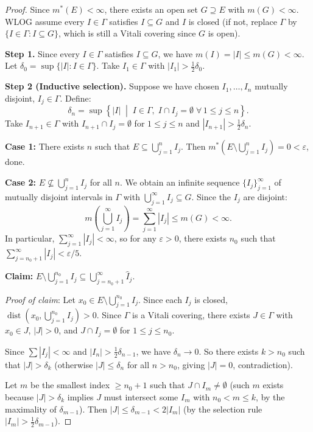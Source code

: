 \documentclass[11pt]{report}
\begin{document}
\begin{proof}
Since $m^*(E) < \infty$, there exists an open set $G \supseteq E$ with $m(G) < \infty$. WLOG assume every $I \in \Gamma$ satisfies $I \subseteq G$ and $I$ is closed (if not, replace $\Gamma$ by $\{I \in \Gamma : I \subseteq G\}$, which is still a Vitali covering since $G$ is open).

\textbf{Step 1.} Since every $I \in \Gamma$ satisfies $I \subseteq G$, we have $m(I) = |I| \leq m(G) < \infty$. Let $\delta_0 = \sup\{|I| : I \in \Gamma\}$. Take $I_1 \in \Gamma$ with $|I_1| > \frac{1}{2}\delta_0$.

\textbf{Step 2 (Inductive selection).} Suppose we have chosen $I_1, \ldots, I_n$ mutually disjoint, $I_j \in \Gamma$. Define:
\[
\delta_n = \sup\left\{|I| \;\middle|\; I \in \Gamma,\; I \cap I_j = \emptyset \;\forall\, 1 \leq j \leq n\right\}.
\]
Take $I_{n+1} \in \Gamma$ with $I_{n+1} \cap I_j = \emptyset$ for $1 \leq j \leq n$ and $|I_{n+1}| > \frac{1}{2}\delta_n$.

\textbf{Case 1:} There exists $n$ such that $E \subseteq \bigcup_{j=1}^{n} I_j$. Then $m^*(E \setminus \bigcup_{j=1}^{n} I_j) = 0 < \varepsilon$, done.

\textbf{Case 2:} $E \not\subseteq \bigcup_{j=1}^{n} I_j$ for all $n$. We obtain an infinite sequence $\{I_j\}_{j=1}^{\infty}$ of mutually disjoint intervals in $\Gamma$ with $\bigcup_{j=1}^{\infty} I_j \subseteq G$. Since the $I_j$ are disjoint:
\[
m\!\left(\bigcup_{j=1}^{\infty} I_j\right) = \sum_{j=1}^{\infty} |I_j| \leq m(G) < \infty.
\]
In particular, $\sum_{j=1}^{\infty} |I_j| < \infty$, so for any $\varepsilon > 0$, there exists $n_0$ such that $\sum_{j=n_0+1}^{\infty} |I_j| < \varepsilon/5$.

\textbf{Claim:} $E \setminus \bigcup_{j=1}^{n_0} I_j \subseteq \bigcup_{j=n_0+1}^{\infty} \hat{I}_j$.

\textit{Proof of claim}: Let $x_0 \in E \setminus \bigcup_{j=1}^{n_0} I_j$. Since each $I_j$ is closed, $\operatorname{dist}(x_0, \bigcup_{j=1}^{n_0} I_j) > 0$. Since $\Gamma$ is a Vitali covering, there exists $J \in \Gamma$ with $x_0 \in J$, $|J| > 0$, and $J \cap I_j = \emptyset$ for $1 \leq j \leq n_0$.

Since $\sum |I_j| < \infty$ and $|I_n| > \frac{1}{2}\delta_{n-1}$, we have $\delta_n \to 0$. So there exists $k > n_0$ such that $|J| > \delta_k$ (otherwise $|J| \leq \delta_n$ for all $n > n_0$, giving $|J| = 0$, contradiction).

Let $m$ be the smallest index $\geq n_0 + 1$ such that $J \cap I_m \neq \emptyset$ (such $m$ exists because $|J| > \delta_k$ implies $J$ must intersect some $I_m$ with $n_0 < m \leq k$, by the maximality of $\delta_{m-1}$). Then $|J| \leq \delta_{m-1} < 2|I_m|$ (by the selection rule $|I_m| > \frac{1}{2}\delta_{m-1}$).


\end{proof}
\end{document}
